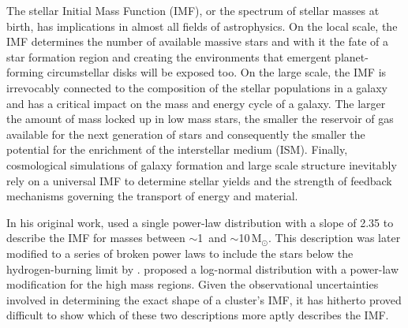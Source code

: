 \documentclass[referee]{aa}
\newcommand{\msune}{M$_\odot$}
\newcommand{\s}{$\sim$}
\begin{document}
The stellar Initial Mass Function (IMF), or the spectrum of stellar masses at birth, has implications in almost all fields of astrophysics.
On the local scale, the IMF determines the number of available massive stars and with it the fate of a star formation region and creating the environments that emergent planet-forming circumstellar disks will be exposed too.
On the large scale, the IMF is irrevocably connected to the composition of the stellar populations in a galaxy and has a critical impact on the mass and energy cycle of a galaxy.
The larger the amount of mass locked up in low mass stars, the smaller the reservoir of gas available for the next generation of stars and consequently the smaller the potential for the enrichment of the interstellar medium (ISM).
Finally, cosmological simulations of galaxy formation and large scale structure inevitably rely on a universal IMF to determine stellar yields and the strength of feedback mechanisms governing the transport of energy and material.

In his original work, \citet{salpeter1955} used a single power-law distribution with a slope of 2.35 to describe the IMF for masses between \s1\ and \s10\,\msune.
This description was later modified to a series of broken power laws to include the stars below the hydrogen-burning limit by \citet{kroupa2001}\@.
\citet{chabrier2003, Chabrier2005} proposed a log-normal distribution with a power-law modification for the high mass regions.
Given the observational uncertainties involved in determining the exact shape of a cluster's IMF, it has hitherto proved difficult to show which of these two descriptions more aptly describes the IMF\@.
\end{document}

